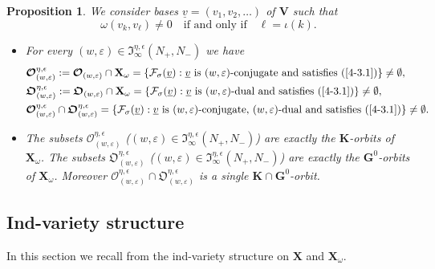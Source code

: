 \documentclass{amsart}
\newtheorem{proposition}{Proposition}
\theoremstyle{definition}
\newcommand{\bs}[1]{\boldsymbol{#1}}
\begin{document}
\begin{proposition}
\label{P4.3}
We consider bases $\underline{v}=(v_1,v_2,\ldots)$ of $\mathbf{V}$ such that 
\begin{equation}
\label{4-3.1}
\omega(v_k,v_\ell)\not=0\quad\mbox{if and only if}\quad \ell=\iota(k).
\end{equation}
\begin{itemize}
\item[\rm (a)] For every $(w,\varepsilon)\in\mathfrak{I}^{\eta,\epsilon}_\infty(N_+,N_-)$ we have
\begin{eqnarray*}
 & \bs{\mathcal{O}}_{(w,\varepsilon)}^{\eta,\epsilon}:=\bs{\mathcal{O}}_{(w,\varepsilon)}\cap\mathbf{X}_\omega=\{\mathcal{F}_\sigma(\underline{v}):\mbox{$\underline{v}$ is $(w,\varepsilon)$-conjugate and satisfies (\ref{4-3.1})}\}\not=\emptyset, \\
 & \bs{\mathfrak{O}}_{(w,\varepsilon)}^{\eta,\epsilon}:=\bs{\mathfrak{O}}_{(w,\varepsilon)}\cap\mathbf{X}_\omega=\{\mathcal{F}_\sigma(\underline{v}):\mbox{$\underline{v}$ is $(w,\varepsilon)$-dual and satisfies (\ref{4-3.1})}\}\not=\emptyset, \\
 & \bs{\mathcal{O}}_{(w,\varepsilon)}^{\eta,\epsilon}\cap\bs{\mathfrak{O}}_{(w,\varepsilon)}^{\eta,\epsilon}=\{\mathcal{F}_\sigma(\underline{v}):\mbox{$\underline{v}$ is $(w,\varepsilon)$-conjugate, $(w,\varepsilon)$-dual and satisfies (\ref{4-3.1})}\}\not=\emptyset.
\end{eqnarray*}
\item[\rm (b)] The subsets $\bs{\mathcal{O}}_{(w,\varepsilon)}^{\eta,\epsilon}$
($(w,\varepsilon)\in\mathfrak{I}_\infty^{\eta,\epsilon}(N_+,N_-)$)
are exactly the $\mathbf{K}$-orbits of $\mathbf{X}_\omega$.
The subsets $\bs{\mathfrak{O}}_{(w,\varepsilon)}^{\eta,\epsilon}$
($(w,\varepsilon)\in\mathfrak{I}_\infty^{\eta,\epsilon}(N_+,N_-)$)
are exactly the $\mathbf{G}^0$-orbits of $\mathbf{X}_\omega$.
Moreover $\bs{\mathcal{O}}_{(w,\varepsilon)}^{\eta,\epsilon}\cap\bs{\mathfrak{O}}_{(w,\varepsilon)}^{\eta,\epsilon}$ is a single $\mathbf{K}\cap\mathbf{G}^0$-orbit.
\end{itemize}
\end{proposition}

\subsection{Ind-variety structure}

\label{S4.4}

In this section we recall from \cite{Dimitrov-Penkov} the ind-variety structure on $\mathbf{X}$ and $\mathbf{X}_\omega$.
\end{document}
